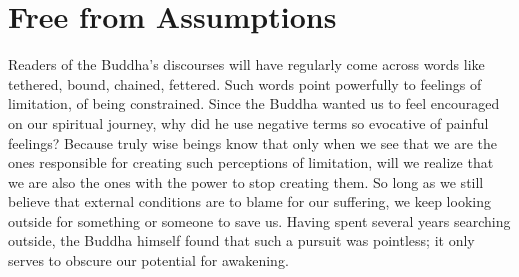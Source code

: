 
\chapter{Free from Assumptions}



Readers of the Buddha’s discourses will have regularly come across words
like tethered, bound, chained,
fettered.\cite{dhp-276}
Such words point powerfully to feelings of limitation, of being constrained. Since the
Buddha wanted us to feel encouraged on our spiritual journey, why did he
use negative terms so evocative of painful feelings? Because truly wise
beings know that only when we see that we are the ones responsible for
creating such perceptions of limitation, will we realize that we are
also the ones with the power to stop creating them. So long as we still
believe that external conditions are to blame for our suffering, we keep
looking outside for something or someone to save us. Having spent
several years searching outside, the Buddha himself found that such a
pursuit was pointless; it only serves to obscure our potential for
awakening.

